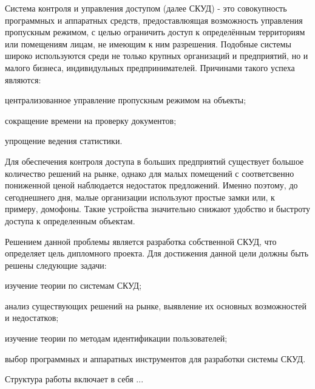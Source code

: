 Система контроля и управления доступом (далее СКУД) - это совокупность программных и аппаратных средств, предоставлюящая возможность управления пропускным режимом, с целью ограничить доступ к определённым территориям или помещениям лицам, не имеющим к ним разрешения. Подобные системы широко используются среди не только крупных организаций и предприятий, но и малого бизнеса, индивидульных предпринимателей. Причинами такого успеха являются:

\begin{itemize*}
\item централизованное управление пропускным режимом на объекты;
\item сокращение времени на проверку документов;
\item упрощение ведения статистики.
\end{itemize*}

Для обеспечения контроля доступа в больших предприятий существует большое количество решений на рынке, однако для малых помещений с соответсвенно пониженной ценой наблюдается недостаток предложений. Именно поэтому, до сегоднешнего дня, малые организации используют простые замки или, к примеру, домофоны. Такие устройства значительно снижают удобство и быстроту доступа к определенным объектам. 

Решением данной проблемы является разработка собственной СКУД, что определяет цель дипломного проекта. Для достижения данной цели должны быть решены следующие задачи:

\begin{itemize*}
\item изучение теории по системам СКУД;
\item анализ существующих решений на рынке, выявление их основных возможностей и недостатков;
\item изучение теории по методам идентификации пользователей;
\item выбор программных и аппаратных инструментов для разработки системы СКУД.
\end{itemize*}

Структура работы включает в себя ...
